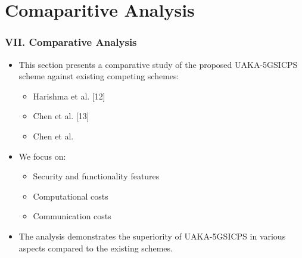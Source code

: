 \documentclass[9pt,handout]{beamer}
\begin{document}
\section{Comaparitive Analysis}
\begin{frame}
    \frametitle{VII. Comparative Analysis}
    \begin{itemize}
        \item This section presents a comparative study of the proposed UAKA-5GSICPS scheme against existing competing schemes:
        \begin{itemize}
            \item Harishma et al. [12]%
            \item Chen et al. [13]%
            \item Chen et al. \cite{chen2019}
        \end{itemize}
        \item We focus on:
        \begin{itemize}
            \item Security and functionality features
            \item Computational costs
            \item Communication costs
        \end{itemize}
        \item The analysis demonstrates the superiority of UAKA-5GSICPS in various aspects compared to the existing schemes.
    \end{itemize}
\end{frame}
\end{document}
